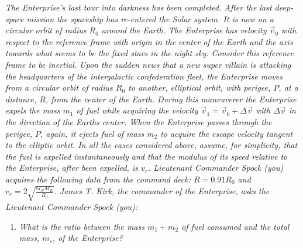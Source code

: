 \begin{example}
	\emph{The Enterprise's last tour into darkness has been completed. After the last deep-space mission the spaceship has re-entered the Solar system. It is now on a circular orbit of radius $R_0$ around the Earth. The Enterprise has velocity $\vec{v}_0$ with respect to the reference frame with origin in the center of the Earth and the axis towards what seems to be the fixed stars in the night sky. Consider this reference frame to be inertial. Upon the sudden news that a new super villain is attacking the headquarters of the intergalactic confederation fleet, the Enterprise moves from a circular orbit of radius $R_0$ to another, elliptical orbit, with perigee, $P$, at a distance, $R$, from the center of the Earth. During this maneuverer the Enterprise expels the mass $m_1$ of fuel while acquiring the velocity $\vec{v}_1=\vec{v}_0+\Delta\vec{v}$ with $\Delta\vec{v}$ in the direction of the Earths center. When the Enterprise passes through the perigee, $P$, again, it ejects fuel of mass $m_2$ to acquire the escape velocity tangent to the elliptic orbit. 
		In all the cases considered above, assume, for simplicity, that the fuel is expelled instantaneously and that the modulus of its speed relative to the Enterprise,	after been expelled, is $v_r$. Lieutenant Commander Spock (you) acquires the following data from the command deck: $R=0.91R_0$ and $v_r=2\sqrt{\frac{G_NM_E}{R_0}}$. 
		James T. Kirk, the commander of the Enterprise, asks the Lieutenant Commander Spock (you):}
	
	\begin{enumerate}
		\item \emph{What is the ratio between the mass $m_1+m_2$ of fuel consumed and the total mass, $m_s$, of the Enterprise?}
		

\end{enumerate}
\end{example}
